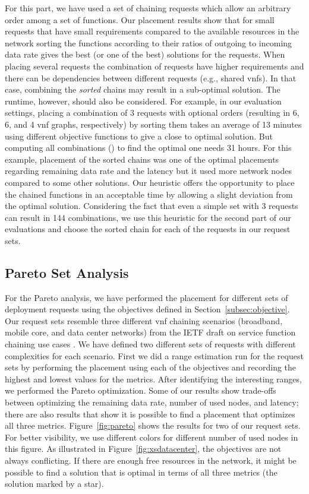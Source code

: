 \documentclass[10pt,a4paper,conference]{IEEEtran}
\begin{document}
For this part, we have used a set of chaining requests which allow an arbitrary order
among a set of functions. Our placement results show that for small requests that
have small requirements compared to the available resources in the network sorting
the functions according to their ratios of outgoing to incoming data rate gives 
the best (or one of the best) solutions for the requests. When placing several requests 
the combination of requests have higher requirements and there can be dependencies 
between different requests (e.g., shared \acp{vnf}). In that case, combining the 
\emph{sorted} chains may result in a sub-optimal solution. 
The runtime, however, should also be considered. For example, 
in our evaluation settings, placing a combination of 3 requests with optional orders 
(resulting in 6, 6, and 4 \ac{vnf} graphs, respectively) 
by sorting them takes an average of 13 minutes using different objective 
functions to give a close to optimal solution. But 
computing all combinations () to find the optimal one needs 31 hours. For 
this example, placement of the sorted chains was one of the optimal placements regarding 
remaining data rate and the latency but it used more network nodes compared to some
other solutions. Our heuristic offers the opportunity to place the chained functions in an
acceptable time by allowing a slight deviation from the optimal solution. Considering
the fact that even a simple set with 3 requests can result in 144 combinations, 
we use this heuristic for the second part of our evaluations and choose the
sorted chain for each of the requests in our request sets.


\subsection{Pareto Set Analysis}

For the Pareto analysis, we have performed 
the placement for different sets of deployment requests using the objectives defined in
Section~\ref{subsec:objective}. Our request sets resemble three different \ac{vnf} chaining
scenarios (broadband, mobile core, and data center networks) from the
IETF draft on service function chaining use cases \cite{draft-liu-sfc-use-cases-05}. We 
have defined two different sets of requests with different complexities for each 
scenario. First we did a range estimation run for the request sets by performing the 
placement using each of the objectives and recording the highest and lowest values 
for the metrics. After identifying the interesting ranges, we performed
the Pareto optimization. Some of our results show trade-offs between optimizing
the remaining data rate, number of used nodes, and latency; there are also
results that show it is possible to find a placement that optimizes all three
metrics. Figure~\ref{fig:pareto} shows the results for two of our request sets.
For better visibility, we use different colors for different number of used nodes 
in this figure. As illustrated in Figure~\ref{fig:xsdatacenter}, the objectives are not 
always conflicting. If there are enough free resources in the network, it might be possible 
to find a solution that is optimal in terms of all three metrics (the solution marked by a star).
\end{document}

